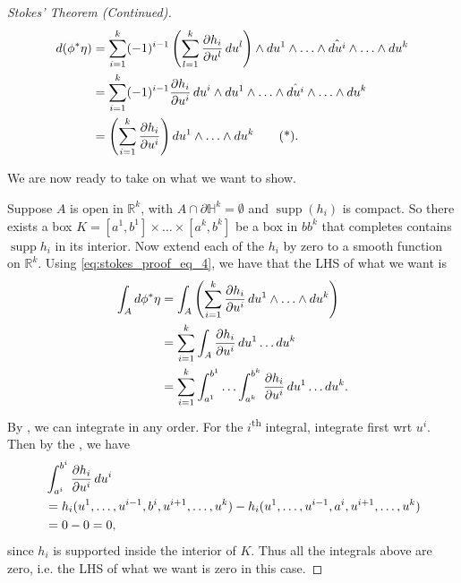 \documentclass[notoc,notitlepage]{tufte-book}
\DeclareMathOperator{\supp}{supp}
\begin{document}
\begin{proof}[Stokes' Theorem (Continued)]
  \begin{align*}
    \dif{(\phi^* \eta)}
    &= \sum_{i=1}^{k} (-1)^{i-1} \left( \sum_{l=1}^{k} \frac{\partial
      h_i}{\partial u^l} \dif{u^l} \right) \land \dif{u^1} \land \hdots \land
      \hat{\dif{u^i}} \land \hdots \land \dif{u^k} \\
    &= \sum_{i=1}^{k} (-1)^{i-1} \frac{\partial h_i}{\partial u^i} \dif{u^i}
      \land \dif{u^1} \land \hdots \land \hat{\dif{u^i}} \land \hdots \land
      \dif{u^k} \\
    &= \left( \sum_{i=1}^{k} \frac{\partial h_i}{\partial u^i} \right) \dif{u^1}
      \land \hdots \land \dif{u^k} \tag{*}\label{eq:stokes_proof_eq_4}.
  \end{align*}

  We are now ready to take on what we want to show.

  \noindent
   Suppose $A$ is open in $\mathbb{R}^k$, with $A \cap \partial
  \mathbb{H}^k = \emptyset$ and $\supp(h_i)$ is compact. So there exists a box
  $K = [a^1, b^1] \times \hdots \times [a^k, b^k]$ be a box in $bb^k$ that
  completes contains $\supp h_i$ in its interior. Now extend each of the $h_i$ 
  by zero to a smooth function on $\mathbb{R}^k$. Using
  \cref{eq:stokes_proof_eq_4}, we have that the LHS of what we want is
  \begin{align*}
    \int_{A} \mathop{}\!d{\phi^* \eta}
    &= \int_{A} \left( \sum_{i=1}^{k} \frac{\partial h_i}{\partial u^i}
    \mathop{}\!d{u^1} \land \hdots \land \mathop{}\!d{u^k} \right) \\
    &= \sum_{i=1}^{k} \int_{A} \frac{\partial h_i}{\partial u^i} \mathop{}\!d{u^1}
    \hdots \mathop{}\!d{u^k} \\
    &= \sum_{i=1}^{k} \int_{a^1}^{b^1} \hdots \int_{a^k}^{b^k} \frac{\partial
    h_i}{\partial u^i} \mathop{}\!d{u^1} \hdots \mathop{}\!d{u^k}.
  \end{align*}
  By , we can integrate in any order. For the
  $i$\textsuperscript{th} integral, integrate first wrt $u^i$. Then by the
  , we have
  \begin{align*}
    &\int_{a^i}^{b^i} \frac{\partial h_i}{\partial u^i} \mathop{}\!d{u^i} \\
    &= h_i(u^1, \ldots, u^{i-1}, b^i, u^{i+1}, \ldots, u^k) - h_i(u^1, \ldots,
    u^{i-1}, a^i, u^{i+1}, \ldots, u^k) \\
    &= 0 - 0 = 0,
  \end{align*}
  since $h_i$ is supported inside the interior of $K$. Thus all the integrals
  above are zero, i.e. the LHS of what we want is zero in this case.


\end{proof}
\end{document}
